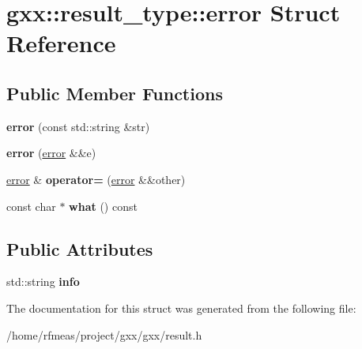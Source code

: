 \hypertarget{structgxx_1_1result__type_1_1error}{}\section{gxx\+:\+:result\+\_\+type\+:\+:error Struct Reference}
\label{structgxx_1_1result__type_1_1error}
\subsection*{Public Member Functions}
\begin{DoxyCompactItemize}
\item 
{\bfseries error} (const std\+::string \&str)\hypertarget{structgxx_1_1result__type_1_1error_aae0084bc8a814eb95f2debaded69b927}{}\label{structgxx_1_1result__type_1_1error_aae0084bc8a814eb95f2debaded69b927}

\item 
{\bfseries error} (\hyperlink{structgxx_1_1result__type_1_1error}{error} \&\&e)\hypertarget{structgxx_1_1result__type_1_1error_a1dda481abc3bee3daefc73fc50dcfffa}{}\label{structgxx_1_1result__type_1_1error_a1dda481abc3bee3daefc73fc50dcfffa}

\item 
\hyperlink{structgxx_1_1result__type_1_1error}{error} \& {\bfseries operator=} (\hyperlink{structgxx_1_1result__type_1_1error}{error} \&\&other)\hypertarget{structgxx_1_1result__type_1_1error_a9e8b271ebb58c5bf70491adf0d0f12ab}{}\label{structgxx_1_1result__type_1_1error_a9e8b271ebb58c5bf70491adf0d0f12ab}

\item 
const char $\ast$ {\bfseries what} () const \hypertarget{structgxx_1_1result__type_1_1error_a0025cb4bd6caf8e4b665f8e9102a5a6d}{}\label{structgxx_1_1result__type_1_1error_a0025cb4bd6caf8e4b665f8e9102a5a6d}

\end{DoxyCompactItemize}
\subsection*{Public Attributes}
\begin{DoxyCompactItemize}
\item 
std\+::string {\bfseries info}\hypertarget{structgxx_1_1result__type_1_1error_a837847f0db09608595b1880e45222468}{}\label{structgxx_1_1result__type_1_1error_a837847f0db09608595b1880e45222468}

\end{DoxyCompactItemize}


The documentation for this struct was generated from the following file\+:\begin{DoxyCompactItemize}
\item 
/home/rfmeas/project/gxx/gxx/result.\+h\end{DoxyCompactItemize}
